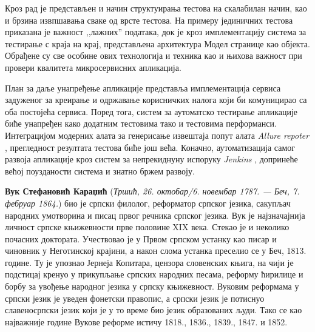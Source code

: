 \documentclass[12pt,oneside]{memoir}
\begin{document}
Кроз рад је представљен и начин структуирања тестова на скалабилан начин, као и брзина извпшавања сваке од врсте тестова. На примеру јединичних тестова приказана је важност ,,лажних” података, док је кроз имплементацију система за тестирање с краја на крај, представљена архитектура Модел странице као објекта. Обрађене су све особине ових технологија и техника као и њихова важност при провери квалитета микросервисних апликација.

План за даље унапређење апликације представља имплементација сервиса задуженог за креирање и одржавање корисничких налога који би комуницирао са оба постојећа сервиса. Поред тога, систем за аутоматско тестирање апликације биће унапређен како додатним тестовима тако и тестовима перформанси. Интеграцијом модерних алата за генерисање извештаја попут алата \textit{Allure repoter} \cite{allure}, прегледност резултата тестова биће још већа. Коначно, аутоматизација самог развоја апликације кроз систем за непрекиднуну испоруку \textit{Jenkins} \cite{jenkins}, допринеће већој поузданости система и знатно бржем развоју.

\literatura

\backmatter

\begin{biografija}
\textbf{Вук Стефановић Караџић} (\emph{Тршић, 26. октобар/6. новембар
  1787. — Беч, 7. фебруар 1864.}) био је српски филолог, реформатор
српског језика, сакупљач народних умотворина и писац првог речника
српског језика.  Вук је најзначајнија личност српске књижевности прве
половине XIX века. Стекао је и неколико почасних доктората.
Учествовао је у Првом српском устанку као писар и чиновник у
Неготинској крајини, а након слома устанка преселио се у Беч,
1813. године. Ту је упознао Јернеја Копитара, цензора словенских
књига, на чији је подстицај кренуо у прикупљање српских народних
песама, реформу ћирилице и борбу за увођење народног језика у српску
књижевност. Вуковим реформама у српски језик је уведен фонетски
правопис, а српски језик је потиснуо славеносрпски језик који је у то
време био језик образованих људи. Тако се као најважније године Вукове
реформе истичу 1818., 1836., 1839., 1847. и 1852.
\end{biografija}
\end{document}
